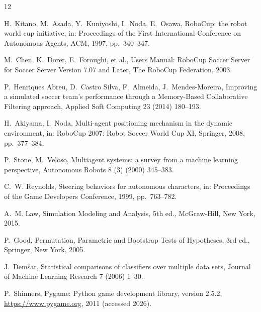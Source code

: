 \documentclass[10pt,twocolumn]{article}
\begin{document}
\begin{thebibliography}{12}\footnotesize

H.~Kitano, M.~Asada, Y.~Kuniyoshi, I.~Noda, E.~Osawa,
RoboCup: the robot world cup initiative,
in: Proceedings of the First International Conference on Autonomous
Agents, ACM, 1997, pp.~340--347.

M.~Chen, K.~Dorer, E.~Foroughi, et al.,
Users Manual: RoboCup Soccer Server for Soccer Server Version 7.07 and
Later, The RoboCup Federation, 2003.

P.~Henriques Abreu, D.~Castro Silva, F.~Almeida, J.~Mendes-Moreira,
Improving a simulated soccer team's performance through a Memory-Based
Collaborative Filtering approach,
Applied Soft Computing 23 (2014) 180--193.

H.~Akiyama, I.~Noda,
Multi-agent positioning mechanism in the dynamic environment,
in: RoboCup 2007: Robot Soccer World Cup XI, Springer, 2008, pp.~377--384.

P.~Stone, M.~Veloso,
Multiagent systems: a survey from a machine learning perspective,
Autonomous Robots 8 (3) (2000) 345--383.

C.~W. Reynolds,
Steering behaviors for autonomous characters,
in: Proceedings of the Game Developers Conference, 1999, pp.~763--782.

A.~M. Law,
Simulation Modeling and Analysis, 5th ed., McGraw-Hill, New York, 2015.

P.~Good,
Permutation, Parametric and Bootstrap Tests of Hypotheses, 3rd ed.,
Springer, New York, 2005.

J.~Dem\v{s}ar,
Statistical comparisons of classifiers over multiple data sets,
Journal of Machine Learning Research 7 (2006) 1--30.

P.~Shinners,
Pygame: Python game development library, version 2.5.2,
\url{https://www.pygame.org}, 2011 (accessed 2026).

\end{thebibliography}
\end{document}
